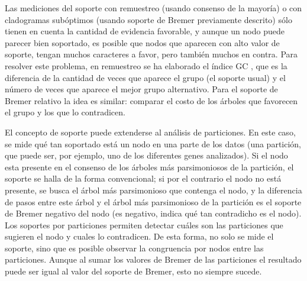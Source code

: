 Las mediciones del soporte con remuestreo (usando consenso de la mayor\'ia) o con cladogramas sub\'optimos (usando soporte de Bremer previamente descrito) s\'olo tienen en cuenta la cantidad de evidencia favorable, y aunque un nodo puede parecer bien soportado, es posible que nodos que aparecen con alto valor de soporte, tengan muchos caracteres a favor, pero tambi\'en muchos en contra. Para resolver este problema, en remuestreo se ha elaborado el \'indice GC \cite{Goloboffetal2003}, que es la diferencia de la cantidad de veces que aparece el grupo (el soporte usual) y el n\'umero de veces que aparece el mejor grupo alternativo. Para el soporte de Bremer relativo \cite{GoloboffFarris2001} la idea es similar: comparar el costo de los \'arboles que favorecen el grupo y los que lo contradicen.

El concepto de soporte puede extenderse al an\'alisis de particiones. En este caso, se mide qu\'e tan soportado est\'a un nodo en una parte de los datos (una partici\'on, que puede ser, por ejemplo, uno de los diferentes genes analizados). Si el nodo esta presente en el consenso de los \'arboles m\'as parsimoniosos de la partici\'on, el soporte se halla de la forma convencional; si por el contrario el nodo no est\'a presente, se busca el \'arbol m\'as parsimonioso que contenga el nodo, y la diferencia de pasos entre este \'arbol y el \'arbol m\'as parsimonioso de la partici\'on es el soporte de Bremer negativo del nodo (es negativo, indica qu\'e tan contradicho es el nodo). Los soportes por particiones permiten detectar cu\'ales son las particiones que sugieren el nodo y cuales lo contradicen. De esta forma, no solo se mide el soporte, sino que es posible observar la congruencia por nodos entre las particiones. Aunque al sumar los valores de Bremer de las particiones el resultado puede ser igual al valor del soporte de Bremer, esto no siempre sucede.



